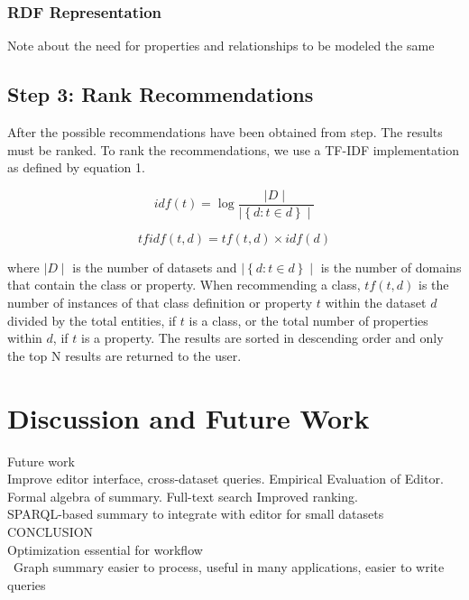 \documentclass[11pt,onecolumn]{article}
\begin{document}
\subsubsection{RDF Representation}
Note about the need for properties and relationships to be modeled the same


\subsection{Step 3: Rank Recommendations}

After the possible recommendations have been obtained from step.  The results must be ranked.  To rank the recommendations, we use a TF-IDF implementation as defined by equation 1.

\begin{equation}
idf(t) = \log{\frac{\mid D \mid}{ \mid \left \{ d : t \in d  \right \} \mid }}
\end{equation}

\begin{equation}
tfidf(t,d) = tf(t,d) \times idf(d)
\end{equation}

where $\mid D \mid$ is the number of datasets and $\mid \left \{ d : t \in d  \right \} \mid$ is the number of domains that contain the class or property. When recommending a class, $tf(t,d)$ is the number of instances of that class definition or property $t$ within the dataset $d$ divided by the total entities, if $t$ is a class, or the total number of properties within $d$, if $t$ is a property. The results are sorted in descending order and only the top N results are returned to the user.

\section{Discussion and Future Work}
Future work\\
Improve editor interface, cross-dataset queries. Empirical Evaluation of Editor.  Formal algebra of summary. Full-text search Improved ranking.\\  
SPARQL-based summary to integrate with editor for small datasets\\
CONCLUSION\\
Optimization essential for workflow\\\
Graph summary easier to process, useful in many applications, easier to write queries\\
\end{document}
